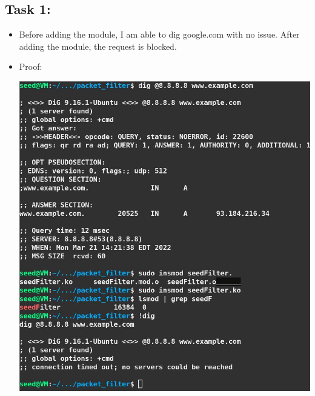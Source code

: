 \documentclass[11pt]{article}
\begin{document}
\subsection*{Task 1:}
\label{sec:org548b5dd}
\begin{itemize}
\item Before adding the module, I am able to dig google.com with no issue. After adding the module, the request is blocked.
\item Proof:
\begin{center}
\includegraphics[width=.9\linewidth]{./images/02.jpg}
\end{center}
\end{itemize}
\end{document}
